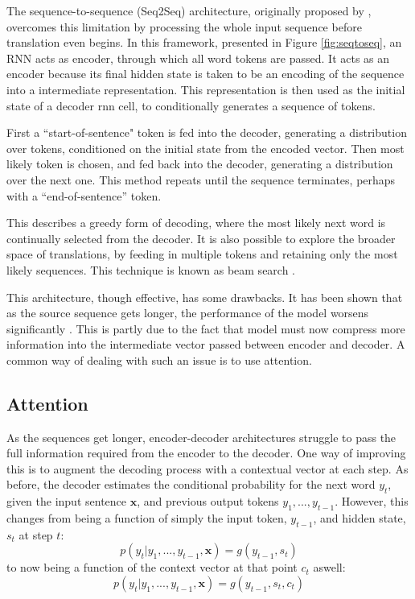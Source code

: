 The sequence-to-sequence (Seq2Seq) architecture, originally proposed by \citet{sutskever_sequence_2014}, overcomes this limitation by processing the whole input sequence before translation even begins. 
In this framework, presented in Figure \ref{fig:seqtoseq}, an RNN acts as encoder, through which all word tokens are passed. 
It acts as an encoder because its final hidden state is taken to be an encoding of the sequence into a intermediate representation. 
This representation is then used as the initial state of a decoder rnn cell, to conditionally generates a sequence of tokens.

First a ``start-of-sentence" token is fed into the decoder, generating a distribution over tokens, conditioned on the initial state from the encoded vector. 
Then most likely token is chosen, and fed back into the decoder, generating a distribution over the next one. 
This method repeats until the sequence terminates, perhaps with a ``end-of-sentence'' token.

This describes a greedy form of decoding, where the most likely next word is continually selected from the decoder.  It is also possible to explore the broader space of translations, by feeding in multiple tokens and retaining only the most likely sequences. This technique is known as beam search \citep{freitag_beam_2017-2}.

This architecture, though effective, has some drawbacks. It has been shown that as the source sequence gets longer, the performance of the model worsens significantly \citep{cho_properties_2014}. 
This is partly due to the fact that model must now compress more information into the intermediate vector passed between encoder and decoder. A common way of dealing with such an issue is to use attention. 




\subsection{Attention} %

As the sequences get longer, encoder-decoder architectures struggle to pass the full information required from the encoder to the decoder. 
One way of improving this is to augment the decoding process with a contextual vector at each step.  
As before, the decoder estimates the conditional probability for the next word $y_t$, given the input sentence $\mathbf{x}$, and previous output tokens ${y_1, ..., y_{t-1}}$.
 However, this changes from being a function of simply the input token, $y_{t-1}$, and hidden state, $s_{t}$ at step $t$:
\begin{equation}
p(y_t| y_1, ..., y_{t-1}, \mathbf{x} ) = g(y_{t-1}, s_t)
\end{equation}
to now being a function of the context vector at that point $c_t$ aswell:
\begin{equation}
p(y_t| y_1, ..., y_{t-1}, \mathbf{x} ) = g(y_{t-1}, s_t, c_t)
\end{equation}

